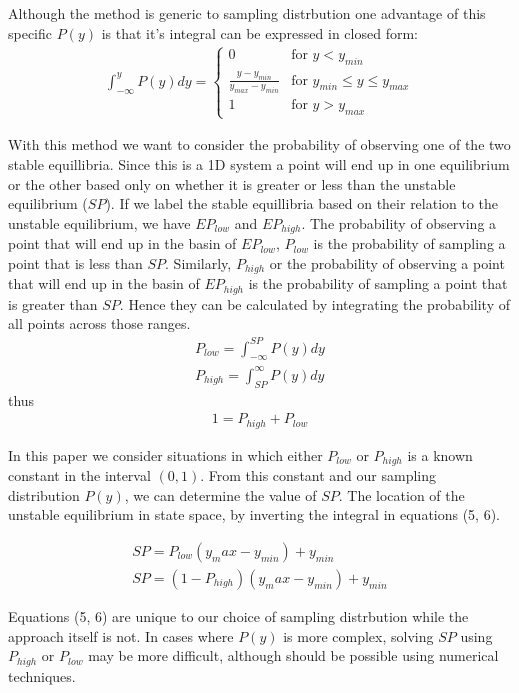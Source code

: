 \documentclass[letterpaper]{article}
\begin{document}
Although the method is generic to sampling distrbution one advantage of this specific
$P(y)$ is that it's integral can be expressed in closed form:
\begin{eqnarray}
  \int_{-\infty}^{y} P(y) dy = 
  \begin{cases}
        0 & \text{for } y < y_{min}\\
        \frac{y-y_{min}}{y_{max} - y_{min}} & \text{for } y_{min}\leq y\leq y_{max}\\
        1 & \text{for } y > y_{max}
  \end{cases}
\end{eqnarray}

With this method we want to consider the probability of observing one of the 
two stable equillibria. Since this is a 1D system a point will end up in one equilibrium
or the other based only on whether it is greater or less than the unstable equilibrium
($SP$).
If we label the stable equillibria based on their relation to the unstable equilibrium,
we have $EP_{low}$ and $EP_{high}$. The probability of observing a point that will end 
up 
in the basin of $EP_{low}$, $P_{low}$ is the probability of sampling a point that is 
less than $SP$. Similarly, $P_{high}$ or the probability of observing a point that 
will end up in the basin of $EP_{high}$ is the probability of sampling a point that is 
greater than $SP$. Hence they can be calculated by integrating the probability of
all points across those ranges.
\begin{eqnarray}
  P_{low} = \int_{-\infty}^{SP} P(y)dy\\
  P_{high} = \int^{\infty}_{SP} P(y)dy
\end{eqnarray}
  thus
\begin{eqnarray}
    1 = P_{high} + P_{low}
\end{eqnarray}

In this paper we consider situations in which either $P_{low}$ or $P_{high}$ is a 
known constant in the interval $(0,1)$. From this constant and our 
sampling distribution $P(y)$, we 
can determine the value of $SP$. The location of the unstable equilibrium in 
state space, by inverting the integral in equations (5, 6).

\begin{eqnarray}
  SP = P_{low}(y_max-y_{min}) + y_{min}\\
  SP = (1-P_{high})(y_max-y_{min}) + y_{min}
\end{eqnarray}

Equations (5, 6) are unique to our choice of sampling distrbution
while the approach itself is not. In cases where $P(y)$
is more complex, solving $SP$ using $P_{high}$ or $P_{low}$ may be more
difficult, although should be possible using numerical techniques.
\end{document}
